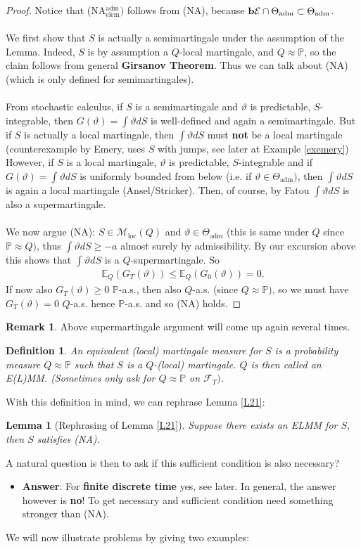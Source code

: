 \documentclass[12pt,a4paper, twoside]{article}
\newtheorem{lem}{Lemma}[section]
\newtheorem{defn}{Definition}[section]
\theoremstyle{definition}
\newtheorem{rem}{Remark}[section]
\newcommand{\EE}{\mathbb{E}} %
\newcommand{\PP}{\mathbb{P}} %
\newcommand{\simple}{\textbf{\text{b}}\mathcal{E}}
\begin{document}
\begin{proof} Notice that (NA$_\text{elem}^\text{adm})$ follows from (NA), because $\simple \cap \Theta_\text{adm} \subset \Theta_\text{adm}$. \\
\\
We first show that $S$ is actually a semimartingale under the assumption of the Lemma. Indeed, $S$ is by assumption a $Q$-local martingale, and $Q \approx \PP$, so the claim follows from general \textbf{Girsanov Theorem}. Thus we can talk about (NA) (which is only defined for semimartingales).
\\\\
From stochastic calculus, if $S$ is a semimartingale and $\vartheta$ is predictable, $S$-integrable, then $G( \vartheta)= \int \vartheta dS$ is well-defined and again a semimartingale. But if $S$ is actually a local martingale,  then $\int \vartheta dS$ must \textbf{not} be a local martingale (counterexample by Emery, uses $S$ with jumps, see later at Example \ref{exemery})
\newpage
However, if $S$ is a local martingale, $\vartheta$ is predictable, $S$-integrable and if $G( \vartheta)= \int \vartheta dS$ is uniformly bounded from below (i.e. if $\vartheta \in \Theta_\text{adm})$, then $\int \vartheta dS$ is again a local martingale (Ansel/Stricker). Then, of course, by Fatou $\int \vartheta dS$ is also a supermartingale. 
\\\\
We now argue (NA): $S \in \mathcal{M}_\text{loc}(Q)$ and $\vartheta \in \Theta_\text{adm}$ (this is same under $Q$ since $\PP \approx Q)$,  thus $\int \vartheta dS \geq -a$ almost surely by admissibility. By our excursion above this shows that $\int \vartheta dS$ is a $Q$-supermartingale. So
\begin{align*}
\EE_Q(G_T( \vartheta)) \leq \EE_Q(G_0( \vartheta))=0.
\end{align*}
If now also $G_T( \vartheta) \geq 0$ $\PP$-a.s., then also $Q$-a.s. (since $Q \approx \PP)$, so we must have $G_T( \vartheta)=0$ $Q$-a.s. hence $\PP$-a.s. and so (NA) holds. 
\end{proof}
\begin{rem} Above supermartingale argument will come up again several times. 
\end{rem}
\begin{defn} An equivalent (local) martingale measure for $S$ is a probability measure $Q \approx \PP$ such that $S$ is a $Q$-(local) martingale. $Q$ is then called an E(L)MM. (Sometimes only ask for $Q \approx \PP$ on $\mathcal{F}_T)$. 
\end{defn}
With this definition in mind, we can rephrase Lemma \ref{L21}:
\begin{lem}[Rephrasing of Lemma \ref{L21}] Suppose there exists an ELMM for $S$, then $S$ satisfies (NA). 
\end{lem}
A natural question is then to ask if this sufficient condition is also necessary?
\begin{itemize}
\item \textbf{Answer}: For \textbf{finite discrete time} yes, see later. In general, the answer however is \textbf{no}! To get necessary and sufficient condition need something stronger than (NA). 
\end{itemize}
We will now illustrate problems by giving two examples:
\end{document}
